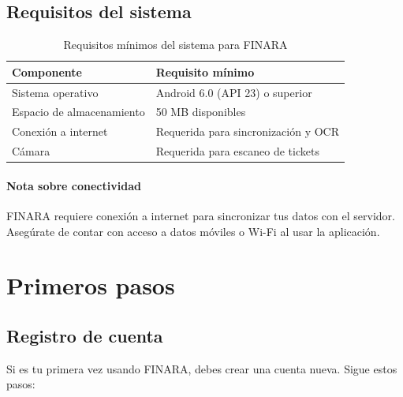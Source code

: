 \documentclass[a4paper,12pt]{report}
\begin{document}
\section{Requisitos del sistema}

\begin{table}[H]
  \centering
  \caption{Requisitos mínimos del sistema para FINARA}
  \label{tab:requisitos}
  \begin{tabular}{ll}
    \toprule
    \textbf{Componente} & \textbf{Requisito mínimo} \\
    \midrule
    Sistema operativo & Android 6.0 (API 23) o superior \\
    Espacio de almacenamiento & 50 MB disponibles \\
    Conexión a internet & Requerida para sincronización y OCR \\
    Cámara & Requerida para escaneo de tickets \\
    \bottomrule
  \end{tabular}
\end{table}

\subsubsection*{Nota sobre conectividad}

FINARA requiere conexión a internet para sincronizar tus datos con el
servidor. Asegúrate de contar con acceso a datos móviles o Wi-Fi al
usar la aplicación.


\chapter{Primeros pasos}

\section{Registro de cuenta}

Si es tu primera vez usando FINARA, debes crear una cuenta nueva.
Sigue estos pasos:
\end{document}
